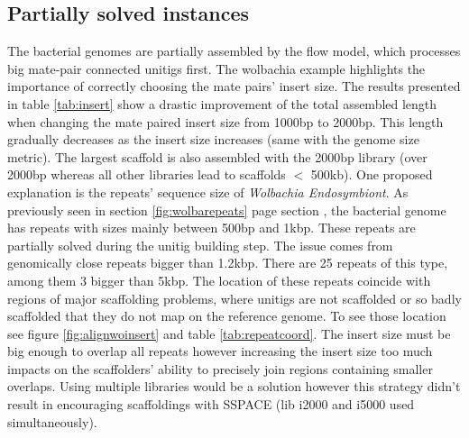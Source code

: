 \documentclass[12pt]{article}
\newcommand*{\fulleref}[1]{section \hyperref[{#1}] {\ref*{#1}} page {\pageref{#1}}}%
\begin{document}
\subsection{Partially solved instances}\label{sec:wolbachia}
The bacterial genomes are partially assembled by the flow model, which processes big mate-pair connected unitigs first. The wolbachia example highlights the importance of correctly choosing the mate pairs' insert size. The results presented in table \ref{tab:insert} show a drastic improvement of the total assembled length when changing the mate paired insert size from 1000bp to 2000bp. This length gradually decreases as the insert size increases (same with the genome size metric). The largest scaffold is also assembled with the 2000bp library (over 2000bp whereas all other libraries lead to scaffolds $<$ 500kb). One proposed explanation is the repeats' sequence size of \textit{Wolbachia Endosymbiont}. As previously seen in \fulleref{fig:wolbarepeats} section  , the bacterial genome has repeats with sizes mainly between 500bp and 1kbp. These repeats are partially solved during the unitig building step. The issue comes from genomically close repeats bigger than 1.2kbp. There are 25 repeats of this type, among them 3 bigger than 5kbp. The location of these repeats coincide with regions of major scaffolding problems, where unitigs are not scaffolded or so badly scaffolded that they do not map on the reference genome. To see those location see figure \ref{fig:alignwoinsert} and table \ref{tab:repeatcoord}. The insert size must be big enough to overlap all repeats however increasing the insert size too much impacts on the scaffolders' ability to precisely join regions containing smaller overlaps. Using multiple libraries would be a solution however this strategy didn't result in encouraging scaffoldings with SSPACE (lib i2000 and i5000 used simultaneously). 
\end{document}
